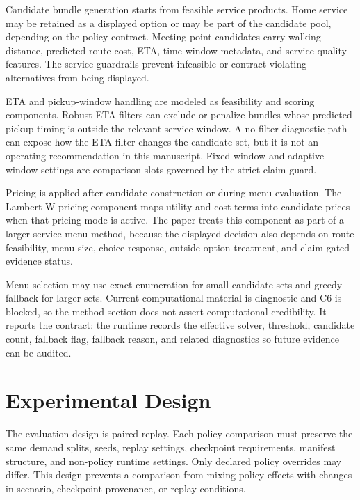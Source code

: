 \documentclass[a4paper,fleqn,review]{cas-dc}
\begin{document}
Candidate bundle generation starts from feasible service products. Home
service may be retained as a displayed option or may be part of the candidate
pool, depending on the policy contract. Meeting-point candidates carry walking
distance, predicted route cost, ETA, time-window metadata, and service-quality
features. The service guardrails prevent infeasible or contract-violating
alternatives from being displayed.

ETA and pickup-window handling are modeled as feasibility and scoring
components. Robust ETA filters can exclude or penalize bundles whose predicted
pickup timing is outside the relevant service window. A no-filter diagnostic
path can expose how the ETA filter changes the candidate set, but it is not an
operating recommendation in this manuscript. Fixed-window and adaptive-window
settings are comparison slots governed by the strict claim guard.

Pricing is applied after candidate construction or during menu evaluation. The
Lambert-W pricing component maps utility and cost terms into candidate prices
when that pricing mode is active. The paper treats this component as part of a
larger service-menu method, because the displayed decision also depends on
route feasibility, menu size, choice response, outside-option treatment, and
claim-gated evidence status.

Menu selection may use exact enumeration for small candidate sets and greedy
fallback for larger sets. Current computational material is diagnostic and C6
is blocked, so the method section does not assert computational credibility.
It reports the contract: the runtime records the effective solver, threshold,
candidate count, fallback flag, fallback reason, and related diagnostics so
future evidence can be audited.

\section{Experimental Design}

The evaluation design is paired replay. Each policy comparison must preserve
the same demand splits, seeds, replay settings, checkpoint requirements,
manifest structure, and non-policy runtime settings. Only declared policy
overrides may differ. This design prevents a comparison from mixing policy
effects with changes in scenario, checkpoint provenance, or replay conditions.
\end{document}
